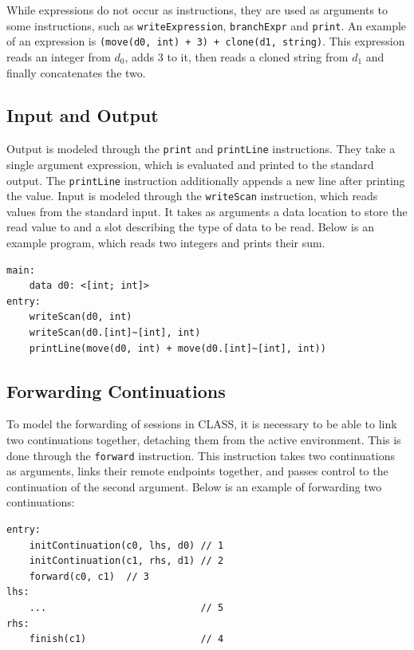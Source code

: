 While expressions do not occur as instructions, they are used as arguments to some instructions, such as \texttt{writeExpression}, \texttt{branchExpr} and \texttt{print}. An example of an expression is \texttt{(move(d0, int) + 3) + clone(d1, string)}. This expression reads an integer from $d_0$, adds $3$ to it, then reads a cloned string from $d_1$ and finally concatenates the two. 

\subsection{Input and Output}

Output is modeled through the \texttt{print} and \texttt{printLine} instructions. They take a single argument expression, which is evaluated and printed to the standard output. The \texttt{printLine} instruction additionally appends a new line after printing the value. Input is modeled through the \texttt{writeScan} instruction, which reads values from the standard input. It takes as arguments a data location to store the read value to and a slot describing the type of data to be read. Below is an example program, which reads two integers and prints their sum.
\begin{lstlisting}[language=IR,frame=bottom]
main:
    data d0: <[int; int]>
entry:
    writeScan(d0, int)
    writeScan(d0.[int]~[int], int)
    printLine(move(d0, int) + move(d0.[int]~[int], int))
\end{lstlisting}


\subsection{Forwarding Continuations}

To model the forwarding of sessions in \ac{CLASS}, it is necessary to be able to link two continuations together, detaching them from the active environment. This is done through the \texttt{forward} instruction. This instruction takes two continuations as arguments, links their remote endpoints together, and passes control to the continuation of the second argument. Below is an example of forwarding two continuations:
\begin{lstlisting}[language=IR,frame=bottom]
entry:
    initContinuation(c0, lhs, d0) // 1
    initContinuation(c1, rhs, d1) // 2
    forward(c0, c1)  // 3
lhs:
    ...                           // 5
rhs:
    finish(c1)                    // 4
\end{lstlisting}

